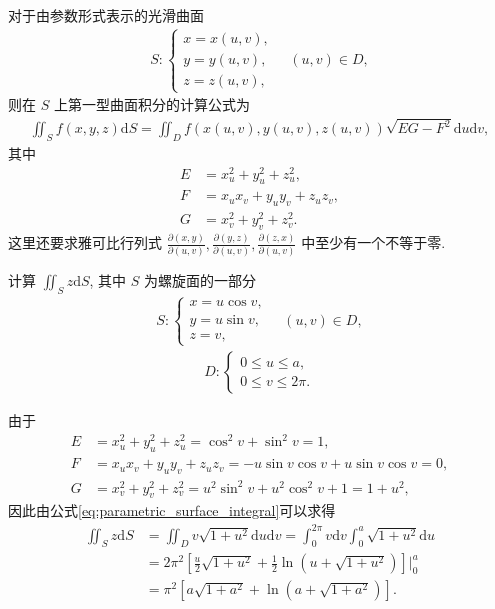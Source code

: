 \documentclass[../../main.tex]{subfiles}%
\begin{document}
\begin{theorem}
对于由参数形式表示的光滑曲面
\begin{align*}
S: \begin{cases}
x=x(u,v), \\
y=y(u,v), \\
z=z(u,v),
\end{cases} \quad (u,v)\in D,
\end{align*}
则在 $S$ 上第一型曲面积分的计算公式为
\begin{align}
\iint_S f(x,y,z)\mathrm{d}S = \iint_D f(x(u,v),y(u,v),z(u,v))\sqrt{EG-F^2}\mathrm{d}u\mathrm{d}v, \label{eq:parametric_surface_integral}
\end{align}
其中
\begin{align*}
E &= x_u^2+y_u^2+z_u^2, \\
F &= x_ux_v+y_uy_v+z_uz_v, \\
G &= x_v^2+y_v^2+z_v^2.
\end{align*}
这里还要求雅可比行列式 $\frac{\partial(x,y)}{\partial(u,v)},\frac{\partial(y,z)}{\partial(u,v)},\frac{\partial(z,x)}{\partial(u,v)}$ 中至少有一个不等于零.
\end{theorem}

\begin{example}
计算 $\iint_S z\mathrm{d}S$, 其中 $S$ 为螺旋面的一部分
\begin{align*}
S: \begin{cases}
x=u\cos v, \\
y=u\sin v, \\
z=v,
\end{cases} \quad (u,v)\in D,
\end{align*}
\begin{align*}
D: \begin{cases}
0\leqslant u\leqslant a, \\
0\leqslant v\leqslant 2\pi.
\end{cases}
\end{align*}
\end{example}

\begin{solution}
由于
\begin{align*}
E &= x_u^2+y_u^2+z_u^2 = \cos^2 v+\sin^2 v = 1, \\
F &= x_ux_v+y_uy_v+z_uz_v = -u\sin v\cos v+u\sin v\cos v = 0, \\
G &= x_v^2+y_v^2+z_v^2 = u^2\sin^2 v+u^2\cos^2 v+1 = 1+u^2,
\end{align*}
因此由公式\eqref{eq:parametric_surface_integral}可以求得
\begin{align*}
\iint_S z\mathrm{d}S &= \iint_D v\sqrt{1+u^2}\mathrm{d}u\mathrm{d}v = \int_0^{2\pi}v\mathrm{d}v\int_0^a\sqrt{1+u^2}\mathrm{d}u \\
&= 2\pi^2\left[\frac{u}{2}\sqrt{1+u^2}+\frac{1}{2}\ln(u+\sqrt{1+u^2})\right]\Big|_0^a \\
&= \pi^2\left[a\sqrt{1+a^2}+\ln(a+\sqrt{1+a^2})\right].
\end{align*}
\end{solution}
\end{document}
